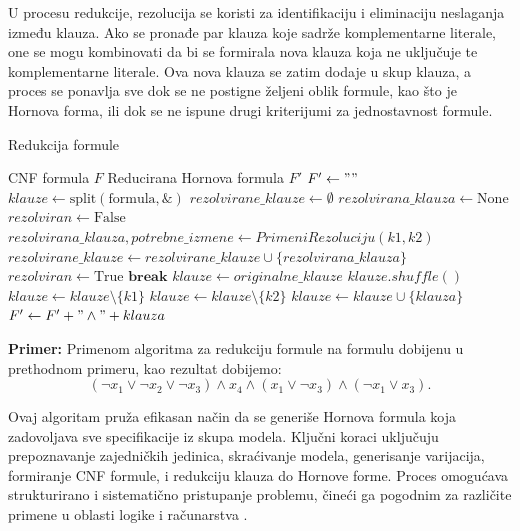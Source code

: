 \documentclass[12pt,oneside]{memoir}
\begin{document}
U procesu redukcije, rezolucija se koristi za identifikaciju i eliminaciju neslaganja između klauza. Ako se pronađe par klauza koje sadrže komplementarne literale, one se mogu kombinovati da bi se formirala nova klauza koja ne uključuje te komplementarne literale. Ova nova klauza se zatim dodaje u skup klauza, a proces se ponavlja sve dok se ne postigne željeni oblik formule, kao što je Hornova forma, ili dok se ne ispune drugi kriterijumi za jednostavnost formule.

\begin{algorithm}[H]
\caption{Redukcija formule}
\renewcommand{\algorithmicrequire}{\textbf{Ulaz:}}
\renewcommand{\algorithmicensure}{\textbf{Izlaz:}}
\begin{algorithmic}[1]
\REQUIRE CNF formula $F$
\ENSURE Reducirana Hornova formula $F'$
\STATE $F' \gets ""$
\STATE $klauze \gets \text{split}(\text{formula}, \&)$
    \STATE $rezolvirane\_klauze \gets \emptyset$
    \STATE $rezolvirana\_klauza \gets \text{None}$
    \STATE $rezolviran \gets \text{False}$
        \STATE $rezolvirana\_klauza, potrebne\_izmene \gets PrimeniRezoluciju(k1,k2)$
            \STATE $rezolvirane\_klauze \gets rezolvirane\_klauze \cup \{rezolvirana\_klauza\}$
        \ENDIF
        \STATE $rezolviran \gets \text{True}$  \STATE $\textbf{break}$
    \ENDFOR
        \STATE $klauze \gets originalne\_klauze$
        \STATE $klauze.shuffle()$
    \ENDIF
        \STATE $klauze \gets klauze \setminus \{k1\}$
        \STATE $klauze \gets klauze \setminus \{k2\}$
    \ENDIF
        \STATE $klauze \gets klauze \cup \{klauza\}$
    \ENDFOR
\ENDWHILE
{}
    \STATE $F' \gets F' + "\wedge" + klauza$
\ENDFOR
\end{algorithmic}
\end{algorithm}

\textbf{Primer:} Primenom algoritma za redukciju formule na formulu dobijenu u prethodnom primeru, kao rezultat dobijemo:
\[
(\neg x_1 \vee \neg x_2 \vee \neg x_3) \wedge x_4 \wedge (x_1 \vee \neg x_3) \wedge (\neg x_1 \vee x_3)\text{.}
\]

Ovaj algoritam pruža efikasan način da se generiše Hornova formula koja zadovoljava sve specifikacije iz skupa modela. Ključni koraci uključuju prepoznavanje zajedničkih jedinica, skraćivanje modela, generisanje varijacija, formiranje CNF formule, i redukciju klauza do Hornove forme. Proces omogućava strukturirano i sistematično pristupanje problemu, čineći ga pogodnim za različite primene u oblasti logike i računarstva \cite{russell}.
\end{document}

